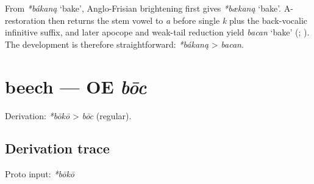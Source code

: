 \documentclass[
  british,
  a4paper,
  openany]{book}
\providecommand{\Recon}[1]{\emph{*#1}}
{\catcode`→=\active \global\def→{\ensuremath{\rightarrow}}}
\providecommand{\texorpdfstring}[2]{#1}
\providecommand{\Recon}[1]{\emph{*#1}}
{\catcode`→=\active \global\def→{\ensuremath{\rightarrow}}}
\begin{document}
From {\Recon{bákaną} `bake'}, Anglo-Frisian brightening first gives
\Recon{bækaną} `bake'. A-restoration then returns the stem vowel to
\emph{a} before single \emph{k} plus the back-vocalic infinitive suffix,
and later apocope and weak-tail reduction yield {\emph{bacan}} `bake'
(;
). The development
is therefore straightforward: {\Recon{bákaną}} \textgreater{}
{\emph{bacan}}.

\section{\texorpdfstring{beech --- OE
\emph{bōc}}{beech --- OE bōc}}\label{beech-oe-bux14dc}


Derivation: \emph{*bōkō} \textgreater{} \emph{bōc} (regular).

\subsection{Derivation trace}\label{derivation-trace-2}

Proto input: \emph{*bōkō}

\begingroup
\setlength{\fboxsep}{6pt}
\end{document}
